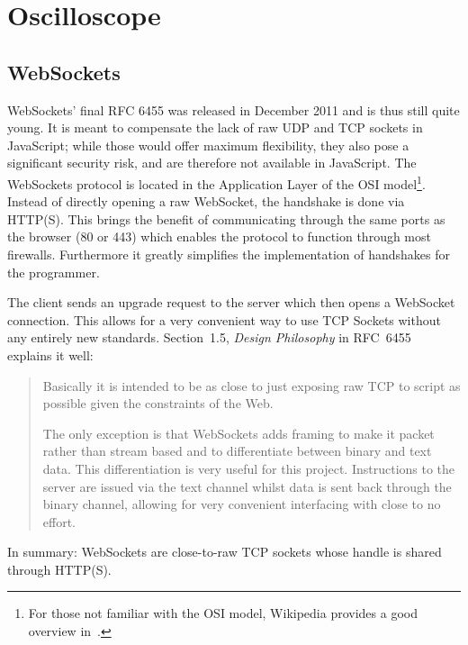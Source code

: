 %
%
\chapter{Oscilloscope} %
\label{ch:app:gui}

%
%
\section{WebSockets} %
\label{sec:app:gui:websockets}

WebSockets' final RFC 6455\cite{rfc:6455} was released in December 2011 and is
thus still quite young. It is meant to  compensate the lack of raw UDP and TCP
sockets in JavaScript; while those  would offer maximum flexibility, they also
pose  a  significant  security  risk,  and  are  therefore  not  available  in
JavaScript.  The  WebSockets protocol is  located in the Application  Layer of
the OSI model\footnote{%
    For  those not  familiar with  the OSI  model, Wikipedia  provides a  good
    overview in~\cite{wiki:osi}.%
}.
Instead  of directly  opening  a  raw WebSocket,  the  handshake  is done  via
HTTP(S). This brings  the benefit of  communicating through the same  ports as
the browser  (\num{80} or  \num{443}) which enables  the protocol  to function
through most  firewalls. Furthermore it greatly simplifies  the implementation
of handshakes for the programmer.

The client sends an upgrade request to the server which then opens a WebSocket
connection.   This allows  for  a  very convenient  way  to  use TCP  Sockets
without any entirely new  standards.  Section~1.5, \emph{Design Philosophy} in
RFC~6455~\cite{rfc:6455} explains it well:
\begin{quote}
    Basically it is intended to be as close to just exposing raw TCP to script
    as possible given the constraints of the Web.

    The  only exception  is that  WebSockets adds  framing to  make it  packet
    rather  than stream  based and  to differentiate  between binary  and text
    data.  This differentiation is  very useful for this project. Instructions
    to the  server are issued  via the text channel  whilst data is  sent back
    through the binary channel, allowing  for very convenient interfacing with
    close to no effort.
\end{quote}
In summary: WebSockets  are close-to-raw  TCP sockets  whose handle  is shared
through HTTP(S).


